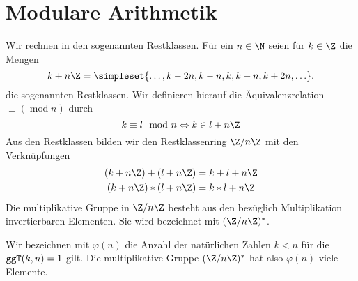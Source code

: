 \chapter{Modulare Arithmetik}
Wir rechnen in den sogenannten Restklassen. Für ein $n\in\N$ seien für $k\in\Z$ die Mengen
\begin{equation*}
	k+n\Z=\simpleset{\ldots,k-2n,k-n,k,k+n,k+2n,\ldots}.
\end{equation*}
die sogenannten Restklassen. Wir definieren hierauf die Äquivalenzrelation $\equiv (\operatorname{mod} n)$ durch
\begin{equation*}
	k\equiv l\mod n\Leftrightarrow k\in l+n\Z
\end{equation*}
Aus den Restklassen bilden wir den Restklassenring $\Z/n\Z$ mit den Verknüpfungen
\begin{align*}
	(k+n\Z)+(l+n\Z)&=k+l+n\Z\\
	(k+n\Z)*(l+n\Z)&=k*l+n\Z\\
\end{align*}
Die multiplikative Gruppe in $\Z/n\Z$ besteht aus den bezüglich Multiplikation invertierbaren Elementen. Sie wird bezeichnet mit $(\Z/n\Z)^\ast$.

Wir bezeichnen mit $\varphi(n)$ die Anzahl der natürlichen Zahlen $k<n$ für die $\texttt{ggT}(k,n)=1$ gilt. Die multiplikative Gruppe $(\Z/n\Z)^\ast$ hat also $\varphi(n)$ viele Elemente.


